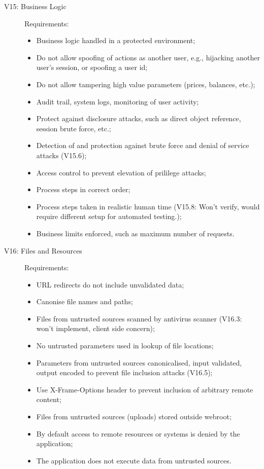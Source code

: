 \documentclass[a4paper]{report}
\begin{document}
\begin{description}
\item[V15: Business Logic] Requirements:
\begin{itemize}
\item Business logic handled in a protected environment;
\item Do not allow spoofing of actions as another user, e.g., hijacking another
user's session, or spoofing a user id;
\item Do not allow tampering high value parameters (prices, balances, etc.);
\item Audit trail, system logs, monitoring of user activity;
\item Protect against disclosure attacks, such as direct object reference, session brute force, etc.;
\item Detection of and protection against brute force and denial of service attacks (V15.6);
\item Access control to prevent elevation of prililege attacks;
\item Process steps in correct order;
\item Process steps taken in realistic human time 
(V15.8: Won't verify, would require different setup for automated testing.);
\item Business limits enforced, such as maximum number of requests.
\end{itemize}

\item[V16: Files and Resources] Requirements:
\begin{itemize}
\item URL redirects do not include unvalidated data;
\item Canonise file names and paths;
\item Files from untrusted sources scanned by antivirus scanner (V16.3: won't implement,
client side concern);
\item No untrusted parameters used in lookup of file locations;
\item Parameters from untrusted sources canonicalised, input validated, output encoded
to prevent file inclusion attacks (V16.5);
\item Use X-Frame-Options header to prevent inclusion of arbitrary remote content;
\item Files from untrusted sources (uploads) stored outside webroot;
\item By default access to remote resources or systems is denied by the application;
\item The application does not execute data from untrusted sources.
\end{itemize}
\end{description}
\end{document}

